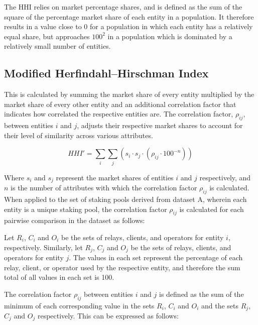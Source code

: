 \documentclass[conference]{IEEEtran}
\begin{document}
The HHI relies on market percentage shares, and is defined as the sum of the square of the percentage market share of each entity in a population.  It therefore results in a value close to 0 for a population in which each entity has a relatively equal share, but approaches $100^2$ in a population which is dominated by a relatively small number of entities.

\subsection{Modified Herfindahl–Hirschman Index}
\label{sec:modified-hhi}
This is calculated by summing the market share of every entity multiplied by the market share of every other entity and an additional correlation factor that indicates how correlated the respective entities are.  The correlation factor, $\rho_{ij}$, between entities $i$ and $j$, adjusts their respective market shares to account for their level of similarity across various attributes.

\[
HHI' = \sum_i \sum_j \left( s_i \cdot s_j \cdot \left( \rho_{ij} \cdot 100^{-n} \right) \right)
\]

Where $s_i$ and $s_j$ represent the market shares of entities $i$ and $j$ respectively, and $n$ is the number of attributes with which the correlation factor $\rho_{ij}$ is calculated. When applied to the set of staking pools derived from dataset A, wherein each entity is a unique staking pool, the correlation factor $\rho_{ij}$ is calculated for each pairwise comparison in the dataset as follows:

Let $R_i$, $C_i$ and $O_i$ be the sets of relays, clients, and operators for entity $i$, respectively. Similarly, let $R_j$, $C_j$ and $O_j$ be the sets of relays, clients, and operators for entity $j$.  The values in each set represent the percentage of each relay, client, or operator used by the respective entity, and therefore the sum total of all values in each set is 100.

The correlation factor $\rho_{ij}$ between entities $i$ and $j$ is defined as the sum of the minimum of each corresponding value in the sets $R_i$, $C_i$ and $O_i$ and the sets $R_j$, $C_j$ and $O_j$ respectively. This can be expressed as follows:
\end{document}
